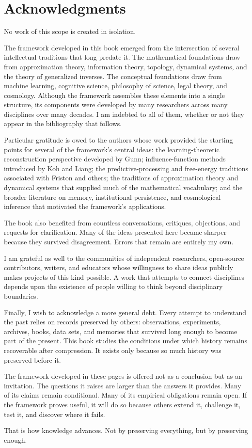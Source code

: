 \chapter*{Acknowledgments}

No work of this scope is created in isolation.

The framework developed in this book emerged from the intersection of several intellectual traditions that long predate it. The mathematical foundations draw from approximation theory, information theory, topology, dynamical systems, and the theory of generalized inverses. The conceptual foundations draw from machine learning, cognitive science, philosophy of science, legal theory, and cosmology. Although the framework assembles these elements into a single structure, its components were developed by many researchers across many disciplines over many decades. I am indebted to all of them, whether or not they appear in the bibliography that follows.

Particular gratitude is owed to the authors whose work provided the starting points for several of the framework's central ideas: the learning-theoretic reconstruction perspective developed by Gunn; influence-function methods introduced by Koh and Liang; the predictive-processing and free-energy traditions associated with Friston and others; the traditions of approximation theory and dynamical systems that supplied much of the mathematical vocabulary; and the broader literature on memory, institutional persistence, and cosmological inference that motivated the framework's applications.

The book also benefited from countless conversations, critiques, objections, and requests for clarification. Many of the ideas presented here became sharper because they survived disagreement. Errors that remain are entirely my own.

I am grateful as well to the communities of independent researchers, open-source contributors, writers, and educators whose willingness to share ideas publicly makes projects of this kind possible. A work that attempts to connect disciplines depends upon the existence of people willing to think beyond disciplinary boundaries.

Finally, I wish to acknowledge a more general debt. Every attempt to understand the past relies on records preserved by others: observations, experiments, archives, books, data sets, and memories that survived long enough to become part of the present. This book studies the conditions under which history remains recoverable after compression. It exists only because so much history was preserved before it.

The framework developed in these pages is offered not as a conclusion but as an invitation. The questions it raises are larger than the answers it provides. Many of its claims remain conditional. Many of its empirical obligations remain open. If the framework proves useful, it will do so because others extend it, challenge it, test it, and discover where it fails.

That is how knowledge advances. Not by preserving everything, but by preserving enough.
